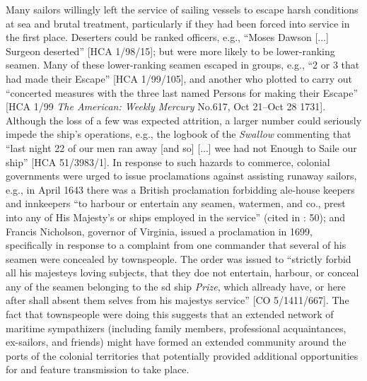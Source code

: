 Many sailors willingly left the service of sailing vessels to escape harsh conditions at sea and brutal treatment, particularly if they had been forced into service in the first place. Deserters could be ranked officers, e.g., “Moses Dawson [...] Surgeon deserted” [HCA 1/98/15]; but were more likely to be lower-ranking seamen. Many of these lower-ranking seamen escaped in groups, e.g., “2 or 3 that had made their Escape” [HCA 1/99/105], and another  who plotted to carry out “concerted measures with the three last named Persons for making their Escape” [HCA 1/99 \textit{The American: Weekly Mercury} No.617, Oct 21–Oct 28 1731]. Although the loss of a few  was expected attrition, a larger number could seriously impede the ship’s operations, e.g., the logbook of the \textit{Swallow} commenting that “last night 22 of our men ran away [and so] [...] wee had not Enough to Saile our ship” [HCA 51/3983/1]. In response to such hazards to commerce, colonial governments were urged to issue proclamations against  assisting runaway sailors, e.g., in April {1643} there was a British proclamation forbidding ale-house keepers and innkeepers “to harbour or entertain any seamen, watermen, and co., prest into any of His Majesty’s or  ships employed in the service” (cited in \citealt{Lavery2009}: 50); and Francis Nicholson, governor of Virginia, issued a proclamation in 1699, specifically in response to a complaint from one commander that several of his seamen were concealed by townspeople. The order was issued to “strictly forbid all his majesteys loving subjects, that they doe not entertain, harbour, or conceal any of the seamen belonging to the sd ship \textit{ Prize}, which allready have, or here after shall absent them selves from his majestys service” [CO 5/1411/667]. The fact that townspeople were doing this suggests that an extended network of maritime sympathizers (including family members, professional acquaintances, ex-sailors, and friends) might have formed an extended community around the ports of the colonial territories that potentially provided additional opportunities for  and feature transmission to take place. 

